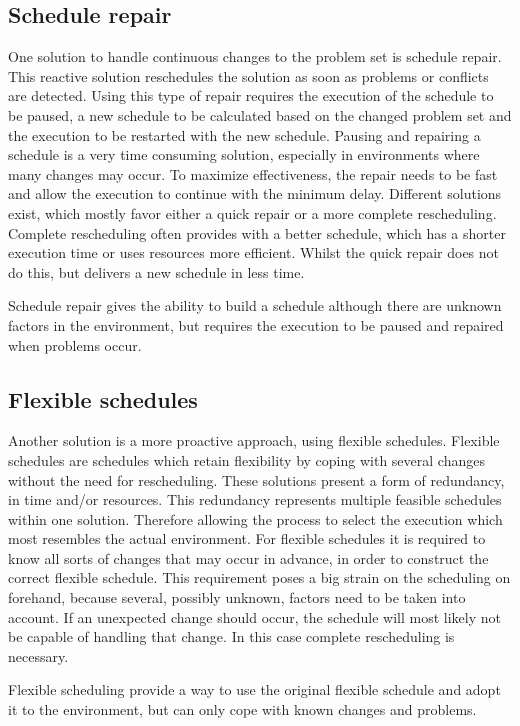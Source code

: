 \documentclass{article}
\begin{document}
\subsection{Schedule repair}
One solution to handle continuous changes to the problem set is schedule repair.
This reactive solution reschedules the solution as soon as problems or conflicts are detected.
Using this type of repair requires the execution of the schedule to be paused, a new schedule to be calculated based on the changed problem set and the execution to be restarted with the new schedule.
Pausing and repairing a schedule is a very time consuming solution, especially in environments where many changes may occur.
To maximize effectiveness, the repair needs to be fast and allow the execution to continue with the minimum delay.
Different solutions exist, which mostly favor either a quick repair or a more complete rescheduling.
\cite{policella07}
Complete rescheduling often provides with a better schedule, which has a shorter execution time or uses resources more efficient.
Whilst the quick repair does not do this, but delivers a new schedule in less time.

Schedule repair gives the ability to build a schedule although there are unknown factors in the environment, but requires the execution to be paused and repaired when problems occur.

\subsection{Flexible schedules}
Another solution is a more proactive approach, using flexible schedules.
Flexible schedules are schedules which retain flexibility by coping with several changes without the need for rescheduling.
These solutions present a form of redundancy, in time and/or resources.
This redundancy represents multiple feasible schedules within one solution.
Therefore allowing the process to select the execution which most resembles the actual environment.
For flexible schedules it is required to know all sorts of changes that may occur in advance, in order to construct the correct flexible schedule.
This requirement poses a big strain on the scheduling on forehand, because several, possibly unknown, factors need to be taken into account.
If an unexpected change should occur, the schedule will most likely not be capable of handling that change.
In this case complete rescheduling is necessary.

Flexible scheduling provide a way to use the original flexible schedule and adopt it to the environment, but can only cope with known changes and problems.
\end{document}

